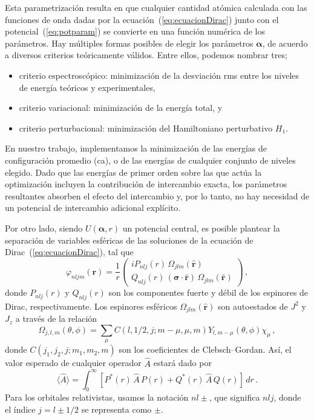 Esta parametrización resulta en que cualquier cantidad atómica calculada 
con las funciones de onda dadas por la ecuación~(\ref{eq:ecuacionDirac}) 
junto con el potencial~(\ref{eq:potparam}) se convierte en una función 
numérica de los parámetros. Hay múltiples formas posibles de elegir los 
parámetros $\boldsymbol{\alpha}$, de acuerdo a diversos criterios 
teóricamente válidos. Entre ellos, podemos nombrar tres;
\begin{itemize}
\item criterio espectroscópico: minimización de la desviación \acs{rms} 
entre los niveles de energía teóricos y experimentales,
\item criterio variacional: minimización de la energía total, y
\item criterio perturbacional: minimización del Hamiltoniano perturbativo
$H_1$. 
\end{itemize}
En nuestro trabajo, implementamos la minimización de las energías de 
configuración promedio (\acs{ca}), o de las energías de cualquier 
conjunto de niveles elegido. Dado que las energías de primer orden sobre 
las que actúa la optimización incluyen la contribución de intercambio 
exacta, los parámetros resultantes absorben el efecto del intercambio y, 
por lo tanto, no hay necesidad de un potencial de intercambio adicional 
explícito.


Por otro lado, siendo $U(\boldsymbol{\alpha},r)$ un potencial central,
es posible plantear la separación de variables esféricas de las 
soluciones de la ecuación de Dirac~(\ref{eq:ecuacionDirac}), tal que
\begin{equation}
\varphi_{nljm}(\mathbf{r}) = \frac{1}{r} \left( 
\begin{array}{c}
i P_{nlj}(r) \,\Omega_{jlm}(\hat{\mathbf{r}}) \\ 
  Q_{nlj}(r) \,(\boldsymbol{\sigma}\cdot\hat{\mathbf{r}})\,\Omega_{jlm}(\hat{\mathbf{r}})
\end{array}
\right)\,,
\label{eq:sepespinor}
\end{equation}
donde $P_{nlj}(r)$ y $Q_{nlj}(r)$ son los componentes fuerte y débil de los 
espinores de Dirac, respectivamente. Los espinores esféricos 
$\Omega_{jlm}(\hat{\mathbf{r}})$ son autoestados de $J^2$ y $J_z$ a 
través de la relación
\begin{equation}
\Omega_{j, l, m}(\theta, \phi)=\sum_{\mu} C(l, 1 / 2, j ; m-\mu, \mu, m) Y_{l, m-\mu}(\theta, \phi) \chi_{\mu}\,,
\end{equation}
donde $C\left(j_{1}, j_{2}, j ; m_{1}, m_{2}, m\right)$ son los
coeficientes de Clebsch--Gordan. Así, el valor esperado de cualquier 
operador $\hat{A}$ estará dado por
\begin{equation}
\langle\hat{A}\rangle=\int_0^{\infty}\left[P^*(r)\,\hat{A}\,P(r) 
 +Q^*(r)\,\hat{A}\,Q(r)
\right]\,dr\,.
\label{eq:meanvalr}
\end{equation}
Para los orbitales relativistas, usamos la notación $nl\pm$, que 
significa $nlj$, donde el índice $j=l\pm1/2$ se representa como $\pm$.

